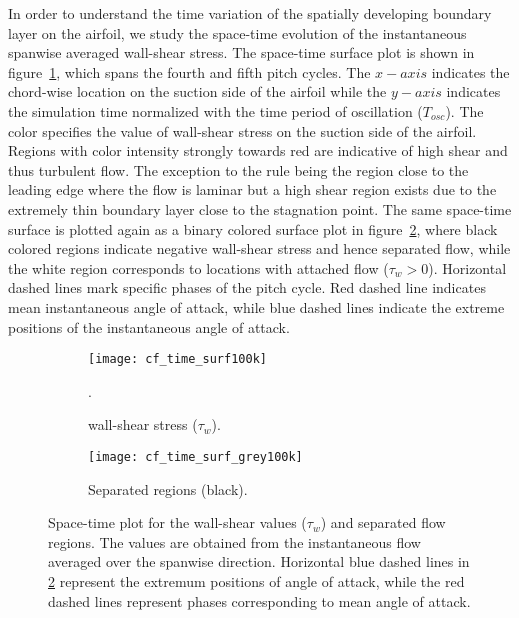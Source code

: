 In order to understand the time variation of the spatially developing boundary layer on the airfoil, we study the space-time evolution of the instantaneous spanwise averaged wall-shear stress. The space-time surface plot is shown in figure~\ref{fig:cf-time}, which spans the fourth and fifth pitch cycles. The $x-axis$ indicates the chord-wise location on the suction side of the airfoil while the $y-axis$ indicates the simulation time normalized with the time period of oscillation ($T_{osc}$). The color specifies the value of wall-shear stress on the suction side of the airfoil. Regions with color intensity strongly towards red are indicative of high shear and thus turbulent flow. The exception to the rule being the region close to the leading edge where the flow is laminar but a high shear region exists due to the extremely thin boundary layer close to the stagnation point. The same space-time surface is plotted again as a binary colored surface plot in figure~\ref{fig:separation-time}, where black colored regions indicate negative wall-shear stress and hence separated flow, while the white region corresponds to locations with attached flow ($\tau_{w}>0$). Horizontal dashed lines mark specific phases of the pitch cycle. Red dashed line indicates mean instantaneous angle of attack, while blue dashed lines indicate the extreme positions of the instantaneous angle of attack.
\begin{figure}[h]
	\centering
	\begin{subfigure}[t]{0.46\textwidth}
		\centering
		\texttt{[image: cf\_time\_surf100k]}
		\caption{wall-shear stress ($\tau_{w}$).}. 
		\label{fig:cf-time}
	\end{subfigure}
	\begin{subfigure}[t]{0.45\textwidth}
		\centering
		\texttt{[image: cf\_time\_surf\_grey100k]}
		\caption{Separated regions (black).} 
		\label{fig:separation-time}
	\end{subfigure}
	\caption{Space-time plot for the wall-shear values ($\tau_{w}$) and separated flow regions. The values are obtained from the instantaneous flow averaged over the spanwise direction. Horizontal blue dashed lines in \ref{fig:separation-time} represent the extremum positions of angle of attack, while the red dashed lines represent phases corresponding to mean angle of attack.}
	\label{fig:space-time}
\end{figure}

